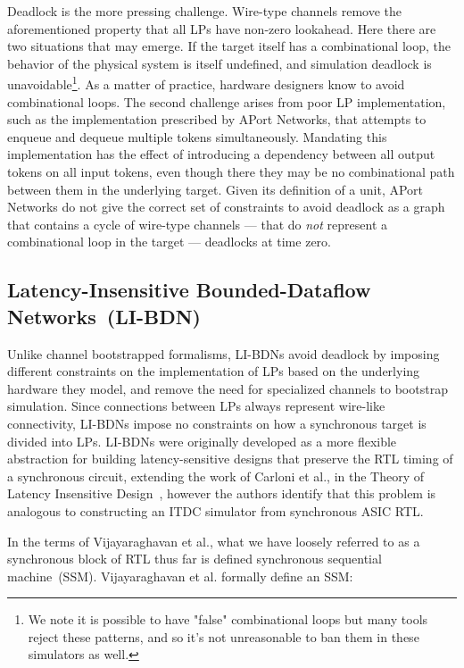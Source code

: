 Deadlock is the more pressing challenge. Wire-type channels remove the
aforementioned property that all LPs have non-zero lookahead.  Here there are
two situations that may emerge. If the target itself has a combinational loop,
the behavior of the physical system is itself undefined, and simulation
deadlock is unavoidable\footnote{We note it is possible to have "false"
combinational loops but many tools reject these patterns, and so it's not
unreasonable to ban them in these simulators as well.}. As a matter of
practice, hardware designers know to avoid combinational loops. The second
challenge arises from poor LP implementation, such as the implementation prescribed by
APort Networks, that attempts to enqueue and dequeue multiple tokens
simultaneously. Mandating this implementation has the effect of introducing a
dependency between all output tokens on all input tokens, even though there
they may be no combinational path between them in
the underlying target. Given its definition of a unit, APort Networks do not
give the correct set of constraints to avoid deadlock as a graph that contains
a cycle of wire-type channels --- that do \emph{not} represent a combinational loop in
the target --- deadlocks at time zero.


\subsection{Latency-Insensitive Bounded-Dataflow Networks~(LI-BDN)}

Unlike channel bootstrapped formalisms, LI-BDNs avoid deadlock by imposing
different constraints on the implementation of LPs based on the underlying
hardware they model, and remove the need for specialized channels to bootstrap
simulation. Since connections between LPs always represent wire-like
connectivity, LI-BDNs impose no constraints on how a synchronous target
is divided into LPs. LI-BDNs were originally developed as a more flexible abstraction for building
latency-sensitive designs that preserve the RTL timing of a synchronous circuit, extending
the work of Carloni et al., in the Theory of Latency Insensitive Design~\cite{TheoryOfLIDesign}, however the authors identify that this problem is analogous
to constructing an ITDC simulator from synchronous ASIC RTL.

In the terms of Vijayaraghavan et al.\cite{LIBDN}, what we have loosely referred to as a synchronous
block of RTL thus far is defined synchronous sequential machine~(SSM). Vijayaraghavan et
al.\cite{LIBDN} formally define an SSM:

